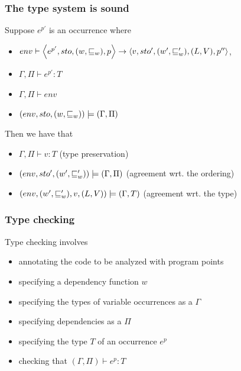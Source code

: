 \documentclass{beamer}
\begin{document}
\begin{frame}
  \frametitle{The type system is sound}

  \begin{theorem}[Soundness]
	Suppose $e^{p'}$ is an occurrence where
	\begin{itemize}
		\item $env\vdash\left\langle e^{p'},sto,(w,\sqsubseteq_w),p\right\rangle\rightarrow\left\langle v,sto',(w',\sqsubseteq_w'),(L,V),p''\right\rangle$,
		\item $\Gamma,\Pi\vdash e^{p'} : T$
		\item $\Gamma,\Pi\vdash env$
		\item $(env,sto,(w,\sqsubseteq_w))\models(\Gamma,\Pi)$
	\end{itemize}
	Then we have that
	\begin{itemize}
		\item $\Gamma,\Pi\vdash v:T$   \alert{(type preservation)}
		\item $(env,sto',(w',\sqsubseteq_w'))\models(\Gamma,\Pi)$
                  \alert{(agreement wrt. the ordering)}
                  
		\item $(env,(w',\sqsubseteq_w'),v,(L,V))\models(\Gamma,T)$  \alert{(agreement wrt. the type)}
	\end{itemize}
      \end{theorem}
      
\end{frame}

\begin{frame}
  \frametitle{Type checking}

  Type checking involves
  
  \begin{itemize}
  \item annotating the code to be analyzed with program points
  \item specifying a dependency function $w$
  \item specifying the types of variable occurrences as a $\Gamma$
 \item specifying dependencies as a $\Pi$
  \item specifying the type $T$ of an occurrence $e^p$
  \item checking that $(\Gamma,\Pi) \vdash e^p : T$
  \end{itemize}

\end{frame}
\end{document}
